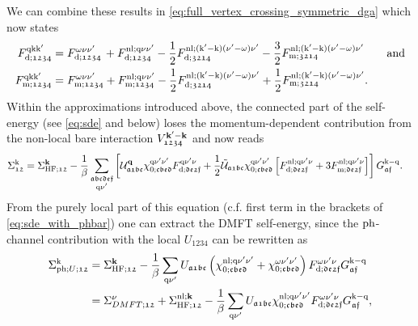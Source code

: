\documentclass[../../main.tex]{subfiles}
\begin{document}
We can combine these results in \eqref{eq:full_vertex_crossing_symmetric_dga} which now states
\begin{subequations}
\begin{align}
	F^{\text{q}\text{k}\text{k}'}_{\text{d};\mathfrak{1234}}&=F^{\omega\nu\nu'}_{\text{d};\mathfrak{1234}}\,+F^{\text{nl};\text{q}\nu\nu'}_{\text{d};\mathfrak{1234}}-\frac12 F_{\text{d};\mathfrak{3214}}^{\text{nl};(\text{k}'-\text{k})(\nu'-\omega)\nu'}-\frac32 F_{\text{m};\mathfrak{3214}}^{\text{nl};(\text{k}'-\text{k})(\nu'-\omega)\nu'}\qquad\text{and}\\
	F^{\text{q}\text{k}\text{k}'}_{\text{m};\mathfrak{1234}}&=F^{\omega\nu\nu'}_{\text{m};\mathfrak{1234}}+F^{\text{nl};\text{q}\nu\nu'}_{\text{m};\mathfrak{1234}}-\frac12 F_{\text{d};\mathfrak{3214}}^{\text{nl};(\text{k}'-\text{k})(\nu'-\omega)\nu'}+\frac12 F_{\text{m};\mathfrak{3214}}^{\text{nl};(\text{k}'-\text{k})(\nu'-\omega)\nu'}.
\end{align}
\end{subequations}
Within the approximations introduced above, the connected part of the self-energy (see \eqref{eq:sde} and below) loses the momentum-dependent contribution from the non-local bare interaction $V^{\textbf{k}'-\textbf{k}}_{\mathfrak{1234}}$ and now reads
\begin{align}\label{eq:sde_with_phbar}
\begin{split}
	\Sigma^{\text{k}}_{\mathfrak{12}}&=\Sigma_{\text{HF};\mathfrak{12}}^{\textbf{k}} -\frac1\beta\sum_{\substack{\mathfrak{abcdef}\\\text{q}\nu'}}\left [\mathcal{U}^{\textbf{q}}_{\mathfrak{a1bc}}\chi^{\text{q}\nu'\nu'}_{0;\mathfrak{cbed}} F^{\text{q}\nu'\nu}_{\text{d};\mathfrak{de2f}}+\frac12\tilde{\mathcal{U}}_{\mathfrak{a1bc}}\chi^{\text{q}\nu'\nu'}_{0;\mathfrak{cbed}}\left [F^{\text{nl};\text{q}\nu'\nu}_{\text{d};\mathfrak{de2f}}+3 F^{\text{nl};\text{q}\nu'\nu}_{\text{m};\mathfrak{de2f}}\right ]\right ]G_{\mathfrak{af}}^{\text{k}-\text{q}}.
\end{split}
\end{align}
From the purely local part of this equation (c.f. first term in the brackets of \eqref{eq:sde_with_phbar}) one can extract the DMFT self-energy, since the $\text{ph}$-channel contribution with the local $U_{\mathfrak{1234}}$ can be rewritten as
\begin{align}
	\Sigma_{\text{ph};U;\mathfrak{12}}^{\text{k}}&=\Sigma_{\text{HF};\mathfrak{12}}^{\textbf{k}}-\frac{1}{\beta}\sum_{\text{q}\nu'}U_{\mathfrak{a1bc}}\left (\chi^{\text{nl};\text{q}\nu'\nu'}_{0;\mathfrak{cbed}}+\chi^{\omega\nu'\nu'}_{0;\mathfrak{cbed}}\right ) F^{\omega\nu'\nu}_{\text{d};\mathfrak{de2f}} G_{\mathfrak{af}}^{\text{k}-\text{q}}\\
	&=\Sigma_{DMFT;\mathfrak{12}}^{\nu}+\Sigma_{\text{HF};\mathfrak{12}}^{\text{nl};\textbf{k}}-\frac{1}{\beta}\sum_{\text{q}\nu'}U_{\mathfrak{a1bc}}\chi^{\text{nl};\text{q}\nu'\nu'}_{0;\mathfrak{cbed}}F^{\omega\nu'\nu}_{\text{d};\mathfrak{de2f}} G_{\mathfrak{af}}^{\text{k}-\text{q}},
\end{align}
\end{document}
